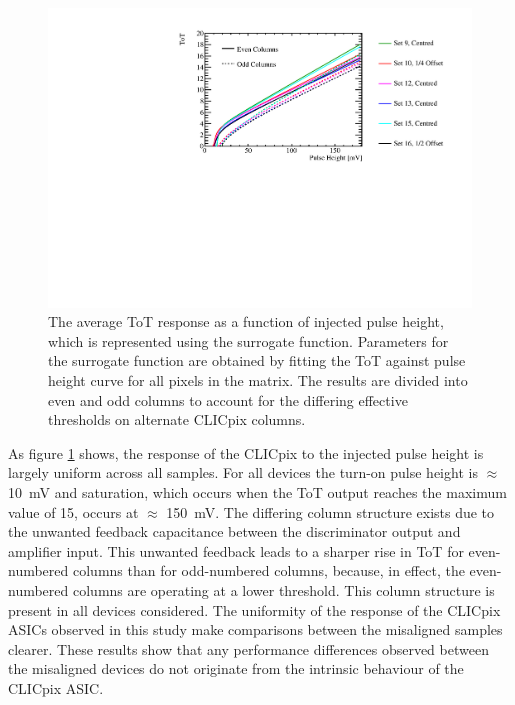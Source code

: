 \begin{figure}[h!]
\centering
\includegraphics[width=1.0\textwidth]{CLICdpVertex/Plots/TestPulseCalibration/FitParam/AverageToT_vs_InjectedPulseHeight.pdf}
\caption[The average ToT response as a function of injected pulse height, which is represented using the surrogate function.  Parameters for the surrogate function are obtained by fitting the ToT against pulse height curve for all pixels in the matrix.  The results are divided into even and odd columns to account for the differing effective thresholds on alternate CLICpix columns.]{The average ToT response as a function of injected pulse height, which is represented using the surrogate function.  Parameters for the surrogate function are obtained by fitting the ToT against pulse height curve for all pixels in the matrix.  The results are divided into even and odd columns to account for the differing effective thresholds on alternate CLICpix columns.}
\label{fig:testpulsemeanfit}
\end{figure}

As figure \ref{fig:testpulsemeanfit} shows, the response of the CLICpix to the injected pulse height is largely uniform across all samples.  For all devices the turn-on pulse height is $\approx$ 10~mV and saturation, which occurs when the ToT output reaches the maximum value of 15, occurs at $\approx$ 150~mV.  The differing column structure exists due to the unwanted feedback capacitance between the discriminator output and amplifier input.  This unwanted feedback leads to a sharper rise in ToT for even-numbered columns than for odd-numbered columns, because, in effect, the even-numbered columns are operating at a lower threshold.  This column structure is present in all devices considered.  The uniformity of the response of the CLICpix ASICs observed in this study make comparisons between the misaligned samples clearer.  These results show that any performance differences observed between the misaligned devices do not originate from the intrinsic behaviour of the CLICpix ASIC.   

